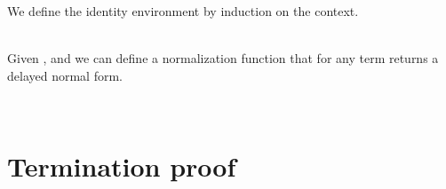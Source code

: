 \documentclass[preliminary,copyright,creativecommons]{eptcs}
\newenvironment{code}{\verbatim}{\endverbatim}
\begin{document}
We define the identity environment by induction on the context.
\begin{code}\> \<[13]\>[13]\AgdaSymbol{:} \<[16]\>[16]     \<\\
\>  \<[13]\>[13]\AgdaSymbol{=} \<[16]\>[16]\<\\
\> \AgdaSymbol{(} \AgdaInductiveConstructor{,} \AgdaSymbol{)} \<[13]\>[13]\AgdaSymbol{=} \<[16]\>[16]  \AgdaSymbol{(} \AgdaSymbol{)} \AgdaInductiveConstructor{,}  \AgdaSymbol{(} \AgdaSymbol{)}\<\end{code}

\noindent
Given ,  and  we can define a
normalization function  that for any term returns a delayed
normal form.

\begin{code}\> \<[10]\>[10]\AgdaSymbol{:} \<[13]\>[13] \AgdaSymbol{\}(} \AgdaSymbol{:}   \AgdaSymbol{)}    \AgdaSymbol{(}  \AgdaSymbol{)}\<\\
\> \AgdaSymbol{\{}\AgdaSymbol{\}}  \<[10]\>[10]\AgdaSymbol{=} \<[13]\>[13]  \AgdaSymbol{(} \AgdaSymbol{)} \AgdaFunction{\ensuremath{\mathbin{{>}\mkern-8.5mu{>}\mkern-2mu{=}}}} \<\end{code}

\section{Termination proof}
\end{document}
